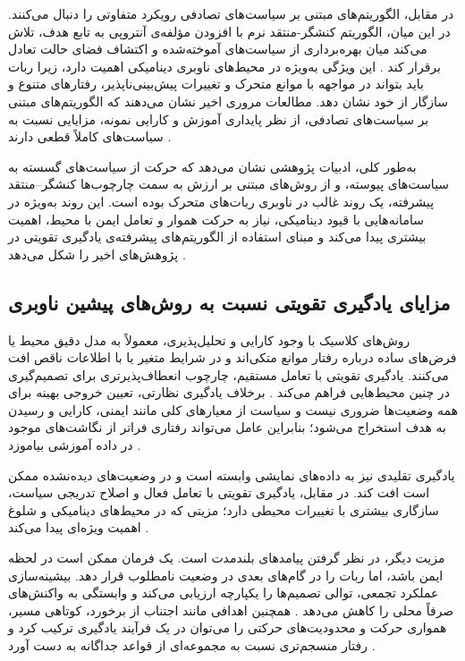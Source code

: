 در مقابل، الگوریتم‌های مبتنی بر سیاست‌های تصادفی%
 رویکرد متفاوتی را دنبال می‌کنند. در این میان، الگوریتم کنشگر-منتقد نرم با افزودن مؤلفه‌ی آنتروپی به تابع هدف، تلاش می‌کند میان بهره‌برداری از سیاست‌های آموخته‌شده و اکتشاف فضای حالت تعادل برقرار کند
\cite{Haarnoja2018SAC}. %
 این ویژگی به‌ویژه در محیط‌های ناوبری دینامیکی اهمیت دارد، زیرا ربات باید بتواند در مواجهه با موانع متحرک و تغییرات پیش‌بینی‌ناپذیر، رفتارهای متنوع و سازگار از خود نشان دهد. مطالعات مروری اخیر نشان می‌دهند که الگوریتم‌های مبتنی بر سیاست‌های تصادفی، از نظر پایداری آموزش و کارایی نمونه، مزایایی نسبت به سیاست‌های کاملاً قطعی دارند %
\cite{Le2024DRLNavigationSurvey,Alsolami2025AutonomousNavigationSurvey}.

به‌طور کلی، ادبیات پژوهشی نشان می‌دهد که حرکت از سیاست‌های گسسته به سیاست‌های پیوسته، و از روش‌های مبتنی بر ارزش به سمت چارچوب‌ها کنشگر--منتقد پیشرفته، یک روند غالب در ناوبری ربات‌های متحرک بوده است. این روند به‌ویژه در سامانه‌هایی با قیود دینامیکی، نیاز به حرکت هموار و تعامل ایمن با محیط، اهمیت بیشتری پیدا می‌کند و مبنای استفاده از الگوریتم‌های پیشرفته‌ی یادگیری تقویتی در پژوهش‌های اخیر را شکل می‌دهد %
\cite{Alsolami2025AutonomousNavigationSurvey}.

\subsection{مزایای یادگیری تقویتی نسبت به روش‌های پیشین ناوبری}

روش‌های کلاسیک با وجود کارایی و تحلیل‌پذیری، معمولاً به مدل دقیق محیط یا فرض‌های ساده درباره رفتار موانع متکی‌اند و در شرایط متغیر یا با اطلاعات ناقص افت می‌کنند. یادگیری تقویتی با تعامل مستقیم، چارچوب انعطاف‌پذیرتری برای تصمیم‌گیری در چنین محیط‌هایی فراهم می‌کند %
\cite{Wang2020G2RL}.
برخلاف یادگیری نظارتی، تعیین خروجی بهینه برای همه وضعیت‌ها ضروری نیست و سیاست از معیارهای کلی مانند ایمنی، کارایی و رسیدن به هدف استخراج می‌شود؛ بنابراین عامل می‌تواند رفتاری فراتر از نگاشت‌های موجود در داده آموزشی بیاموزد %
\cite{Zhu2021}.

یادگیری تقلیدی نیز به داده‌های نمایشی وابسته است و در وضعیت‌های دیده‌نشده ممکن است افت کند. در مقابل، یادگیری تقویتی با تعامل فعال و اصلاح تدریجی سیاست، سازگاری بیشتری با تغییرات محیطی دارد؛ مزیتی که در محیط‌های دینامیکی و شلوغ اهمیت ویژه‌ای پیدا می‌کند %
\cite{s25113394}.

مزیت دیگر، در نظر گرفتن پیامدهای بلندمدت است. یک فرمان ممکن است در لحظه ایمن باشد، اما ربات را در گام‌های بعدی در وضعیت نامطلوب قرار دهد. بیشینه‌سازی عملکرد تجمعی، توالی تصمیم‌ها را یکپارچه ارزیابی می‌کند و وابستگی به واکنش‌های صرفاً محلی را کاهش می‌دهد %
\cite{Wang2020G2RL}.
همچنین اهدافی مانند اجتناب از برخورد، کوتاهی مسیر، همواری حرکت و محدودیت‌های حرکتی را می‌توان در یک فرآیند یادگیری ترکیب کرد و رفتار منسجم‌تری نسبت به مجموعه‌ای از قواعد جداگانه به دست آورد %
\cite{Lee2022DRLNavigation}.

